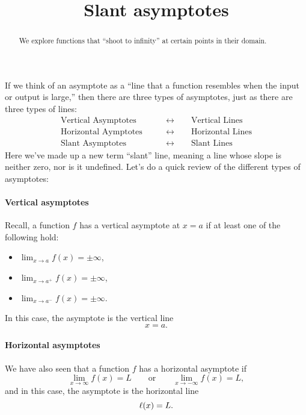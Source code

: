 \documentclass{ximera}
\title[Dig-In:]{Slant asymptotes}
\begin{document}
\begin{abstract}
We explore functions that ``shoot to infinity'' at certain points in
their domain.
\end{abstract}
\maketitle

If we think of an asymptote as a ``line that a function resembles when
the input or output is large,'' then there are three types of asymptotes, just
as there are three types of lines:
\begin{align*}
  \text{Vertical Asymptotes} \qquad&\leftrightarrow\qquad \text{Vertical Lines}\\
  \text{Horizontal Aymptotes}\qquad&\leftrightarrow\qquad \text{Horizontal Lines} \\
  \text{Slant Asymptotes}\qquad&\leftrightarrow\qquad \text{Slant Lines} 
\end{align*}
Here we've made up a new term ``slant'' line, meaning a line whose
slope is neither zero, nor is it undefined. Let's do a quick review of
the different types of asymptotes:



\paragraph{Vertical asymptotes}

Recall, a function $f$ has a vertical asymptote at $x=a$ if at least
one of the following hold:
\begin{itemize}
	\item $\lim_{x\to a} f(x) = \pm\infty$,
	\item $\lim_{x\to a^+} f(x) = \pm\infty$,
	\item $\lim_{x\to a^-} f(x) = \pm\infty$.
\end{itemize}
In this case, the asymptote is the vertical line
\[ x = a. \]



\paragraph{Horizontal asymptotes}

We have also seen that a function $f$ has a horizontal asymptote if
\[ \lim_{x\to \infty} f(x) = L \qquad\text{or}\qquad \lim_{x\to -\infty} f(x) = L, \]
and in this case, the asymptote is the horizontal line
\[ \ell(x) = L. \]
\end{document}
